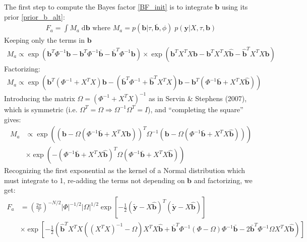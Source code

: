 \documentclass[10pt]{article}
\newcommand{\der}{{\text{d}}} %
\begin{document}
The first step to compute the Bayes factor \eqref{BF_init} is to integrate $\bm{b}$ using its prior \eqref{prior_b_alt}:
\begin{equation}
  \begin{aligned}
F_a = \int M_a \; \der \bm{b} \text{ where } M_a = p(\bm{b}|\tau,\bm{\bar{b}},\phi) \; p(\bm{y}|X,\tau,\bm{b})
  \end{aligned}
\end{equation}
Keeping only the terms in $\bm{b}$
\begin{equation}
  \begin{aligned}
    M_a \propto \exp ( \bm{b}^T \Phi^{-1} \bm{b} - \bm{b}^T \Phi^{-1} \bm{\bar{b}} - \bm{\bar{b}}^T \Phi^{-1} \bm{b} ) \times \exp ( \bm{b}^T X^T X \bm{b} - \bm{b}^T X^T X \hat{\bm{b}} - \hat{\bm{b}}^T X^T X \bm{b} )
  \end{aligned}
\end{equation}
Factorizing:
\begin{equation}
  \begin{aligned}
    M_a \propto \exp ( \bm{b}^T ( \Phi^{-1} + X^T X ) \bm{b} - (\bm{\bar{b}}^T \Phi^{-1} + \hat{\bm{b}}^T X^T X) \bm{b} - \bm{b}^T (\Phi^{-1} \bm{\bar{b}} + X^T X \hat{\bm{b}}) )
  \end{aligned}
\end{equation}
Introducing the matrix $\Omega=(\Phi^{-1} + X^TX)^{-1}$ as in Servin \& Stephens (2007), which is symmetric (i.e. $\Omega^T=\Omega \Rightarrow \Omega^{-1}\Omega^T=I$), and ``completing the square'' gives:
\begin{equation}
  \begin{aligned}
    M_a &\propto \exp ( (\bm{b} - \Omega(\Phi^{-1} \bm{\bar{b}} + X^T X \hat{\bm{b}}))^T \Omega^{-1} (\bm{b} - \Omega(\Phi^{-1} \bm{\bar{b}} + X^T X \hat{\bm{b}})) ) \\
    &\times \exp ( - (\Phi^{-1} \bar{\bm{b}} + X^T X \hat{\bm{b}})^T \Omega (\Phi^{-1} \bar{\bm{b}} + X^T X \hat{\bm{b}}) )
  \end{aligned}
\end{equation}
Recognizing the first exponential as the kernel of a Normal distribution which must integrate to 1, re-adding the terms not depending on $\bm{b}$ and factorizing, we get:
\begin{equation}
  \begin{aligned}
    F_a &= \left(\frac{2\pi}{\tau}\right)^{-N/2} |\Phi|^{-1/2} |\Omega|^{1/2} \exp \left[-\frac{1}{2} (\tilde{\bm{y}} -X \hat{\bm{b}})^T (\tilde{\bm{y}} -X \hat{\bm{b}}) \right] \\
    &\times \exp \left[-\frac{1}{2} (\hat{\bm{b}}^T X^T X ((X^T X)^{-1} - \Omega) X^T X \hat{\bm{b}} + \bar{\bm{b}}^T \Phi^{-1} (\Phi - \Omega) \Phi^{-1} \bar{\bm{b}} -2 \bar{\bm{b}}^T \Phi^{-1} \Omega X^T X \hat{\bm{b}}) \right]
  \end{aligned}
\end{equation}
\end{document}
